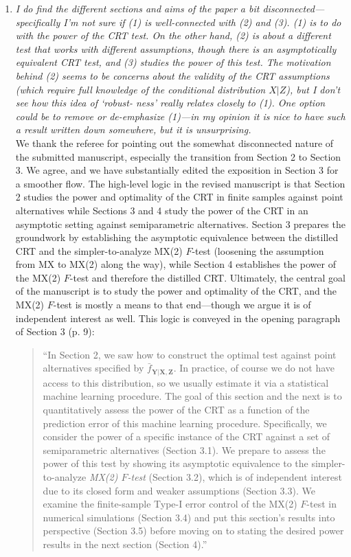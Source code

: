 \documentclass[12pt]{article}
\begin{document}
\begin{enumerate}
	\item \textsl{I do find the different sections and aims of the paper a bit disconnected— specifically I’m not sure if (1) is well-connected with (2) and (3). (1) is to do with the power of the CRT test. On the other hand, (2) is about a different test that works with different assumptions, though there is an asymptotically equivalent CRT test, and (3) studies the power of this test. The motivation behind (2) seems to be concerns about the validity of the CRT assumptions (which require full knowledge of the conditional distribution $X|Z$), but I don’t see how this idea of ‘robust- ness’ really relates closely to (1). One option could be to remove or de-emphasize (1)—in my opinion it is nice to have such a result written down somewhere, but it is unsurprising.}\\
	
	We thank the referee for pointing out the somewhat disconnected nature of the submitted manuscript, especially the transition from Section 2 to Section 3. We agree, and we have substantially edited the exposition in Section 3 for a smoother flow. The high-level logic in the revised manuscript is that Section 2 studies the power and optimality of the CRT in finite samples against point alternatives while Sections 3 and 4 study the power of the CRT in an asymptotic setting against semiparametric alternatives. Section 3 prepares the groundwork by establishing the asymptotic equivalence between the distilled CRT and the simpler-to-analyze MX(2) $F$-test (loosening the assumption from MX to MX(2) along the way), while Section 4 establishes the power of the MX(2) $F$-test and therefore the distilled CRT. Ultimately, the central goal of the manuscript is to study the power and optimality of the CRT, and the MX(2) $F$-test is mostly a means to that end---though we argue it is of independent interest as well. This logic is conveyed in the opening paragraph of Section 3 (p. 9):
	
	\begin{quote}
		``In Section 2, we saw how to construct the optimal test against point alternatives specified by $\bar f_{\bm Y| \bm X, \bm Z}$. In practice, of course we do not have access to this distribution, so we usually estimate it via a statistical machine learning procedure. The goal of this section and the next is to quantitatively assess the power of the CRT as a function of the prediction error of this machine learning procedure. Specifically, we consider  the power of a specific instance of the CRT against a set of semiparametric alternatives (Section 3.1). We prepare to assess the power of this test by showing its asymptotic equivalence to the simpler-to-analyze \textit{MX(2) $F$-test} (Section 3.2), which is of independent interest due to its closed form and weaker assumptions (Section 3.3). We examine the finite-sample Type-I error control of the MX(2) $F$-test in numerical simulations (Section 3.4) and put this section's results into perspective (Section 3.5) before moving on to stating the desired power results in the next section (Section 4).''
	\end{quote}
	 	

\end{enumerate}
\end{document}
